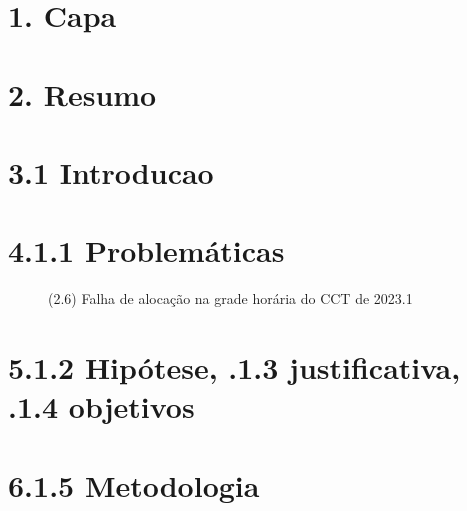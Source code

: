 

% 

\pretextual{} %


% 


% 
% 
% 
% 
% 
% 
% 
% 
% 

\textual{} %

\chapter*{1. Capa}
\chapter*{2. Resumo}
\chapter{3.1 Introducao}
\chapter*{4.1.1 Problemáticas}
\cite{BARHAM1978}

\cite{thomas_visualization_2009}

\cite{miranda_udpskeduler_2012}
\begin{figure}[htpb]\caption{(2.6) Falha de alocação na grade horária do CCT de 2023.1}\end{figure}
\chapter*{5.1.2 Hipótese, .1.3 justificativa, .1.4 objetivos}
\chapter*{6.1.5 Metodologia}
\cite{bourque_swebok_2014}

